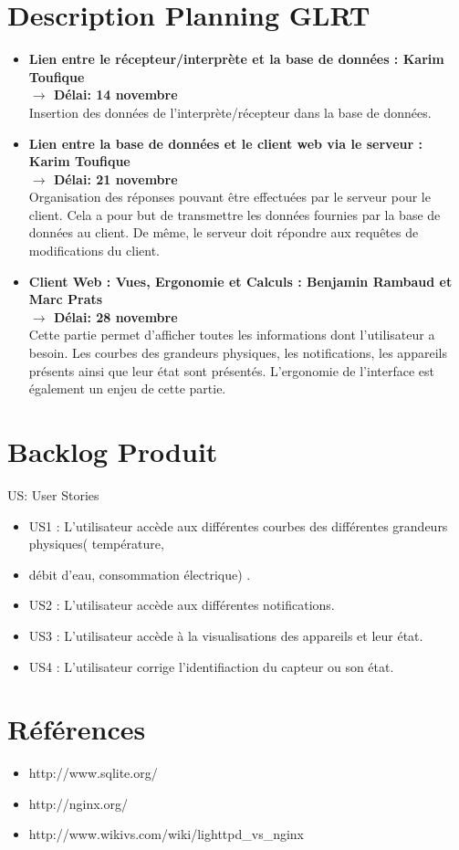 \documentclass[10pt,a4paper]{article}
\begin{document}
\section{Description Planning GLRT}
\begin{itemize}
\item \textbf{ Lien entre le récepteur/interprète et la base de données : Karim Toufique
\\ $\rightarrow$ Délai: 14 novembre}\\
Insertion des données de l'interprète/récepteur dans la base de données.\\ 
\item \textbf{Lien entre la base de données et le client web via le serveur : Karim Toufique 
\\$\rightarrow$ Délai: 21 novembre}\\
Organisation des réponses pouvant être effectuées par le serveur pour le client. Cela a pour but de transmettre les données fournies par la base de données au client. De même, le serveur doit répondre aux requêtes de modifications du client.\\ 

\item \textbf{Client Web : Vues, Ergonomie et Calculs : Benjamin Rambaud et Marc Prats 
\\$\rightarrow$ Délai: 28 novembre}\\
Cette partie permet d'afficher toutes les informations dont l'utilisateur a besoin. Les courbes des grandeurs physiques, les notifications, les appareils présents ainsi que leur état sont présentés. L'ergonomie de l'interface est également un enjeu de cette partie.\\    
\end{itemize}



\section{Backlog Produit}
US: User Stories
\begin{itemize}
\item US1 : L'utilisateur accède aux différentes courbes des différentes grandeurs physiques( température, \item débit d'eau, consommation électrique) .
\item US2 : L'utilisateur accède aux différentes notifications.
\item US3 : L'utilisateur accède à la visualisations des appareils et leur état.
\item US4 : L'utilisateur corrige l'identifiaction du capteur ou son état. 

\end{itemize}

\section{}


\section{Références}
\begin{itemize}
\item http://www.sqlite.org/
\item http://nginx.org/ 
\item http://www.wikivs.com/wiki/lighttpd\_vs\_nginx
\end{itemize}
\end{document}
